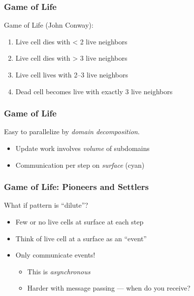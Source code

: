 \documentclass{beamer}
\begin{document}
\begin{frame}
  \frametitle{Game of Life}

  \begin{center}
    
  \end{center}

  Game of Life (John Conway):
  \begin{enumerate}
  \item Live cell dies with < 2 live neighbors
  \item Live cell dies with > 3 live neighbors
  \item Live cell lives with 2--3 live neighbors
  \item Dead cell becomes live with exactly 3 live neighbors
  \end{enumerate}
\end{frame}

\begin{frame}
  \frametitle{Game of Life}

  \begin{center}
    
  \end{center}

  Easy to parallelize by {\em domain decomposition}.
  \begin{itemize}
  \item Update work involves {\em volume} of subdomains
  \item Communication per step on {\em surface} (cyan)
  \end{itemize}

\end{frame}


\begin{frame}
  \frametitle{Game of Life: Pioneers and Settlers}

  What if pattern is ``dilute''?
  \begin{itemize}
  \item Few or no live cells at surface at each step
  \item Think of live cell at a surface as an ``event''
  \item Only communicate events!
    \begin{itemize}
    \item This is {\em asynchronous}
    \item Harder with message passing --- when do you receive?
    \end{itemize}
  \end{itemize}

\end{frame}
\end{document}
